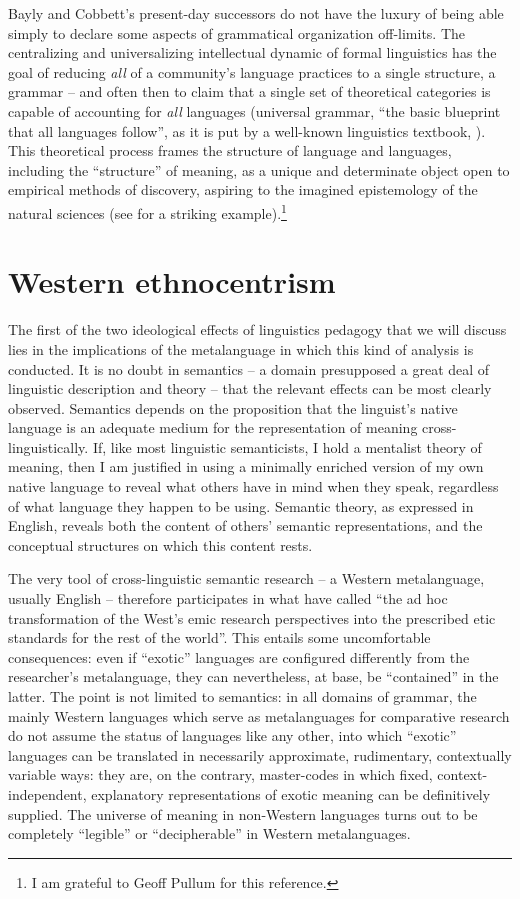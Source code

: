 \documentclass[output=paper]{langscibook}
\begin{document}
Bayly and Cobbett's present-day successors do not have the luxury of being able simply to declare some aspects of grammatical organization off-limits. The centralizing and universalizing intellectual dynamic of formal linguistics has the goal of reducing \emph{all} of a community's language practices to a single structure, a grammar – and often then to claim that a single set of theoretical categories is capable of accounting for \emph{all} languages (universal grammar, ``the basic blueprint that all languages follow'', as it is put by a well-known linguistics textbook, \citealt[18]{Fromkinetal2010}). This theoretical process frames the structure of language and languages, including the ``structure'' of meaning, as a unique and determinate object open to empirical methods of discovery, aspiring to the imagined epistemology of the natural sciences (see \citealt{Zwicky1973} for a striking example).\footnote{I am grateful to Geoff Pullum for this reference.}

\section{Western ethnocentrism}
\label{sec:riemer:westernethnocentrim}

The first of the two ideological effects of linguistics pedagogy that we will discuss lies in the implications of the metalanguage in which this kind of analysis is conducted. It is no doubt in semantics – a domain presupposed a great deal of linguistic description and theory – that the relevant effects can be most clearly observed. Semantics depends on the proposition that the linguist's native language is an adequate medium for the representation of meaning cross-linguistically. If, like most linguistic semanticists, I hold a mentalist theory of meaning, then I am justified in using a minimally enriched version of my own native language to reveal what others have in mind when they speak, regardless of what language they happen to be using. Semantic theory, as expressed in English, reveals both the content of others' semantic representations, and the conceptual structures on which this content rests.

The very tool of cross-linguistic semantic research – a Western metalanguage, usually English – therefore participates in what \citet[109]{AnchimbeJanney2017} have called ``the ad hoc transformation of the West's emic research perspectives into the prescribed etic standards for the rest of the world''. This entails some uncomfortable consequences: even if ``exotic'' languages are configured differently from the researcher's metalanguage, they can nevertheless, at base, be ``contained'' in the latter. The point is not limited to semantics: in all domains of grammar, the mainly Western languages which serve as metalanguages for comparative research do not assume the status of languages like any other, into which ``exotic'' languages can be translated in necessarily approximate, rudimentary, contextually variable ways: they are, on the contrary, master-codes in which fixed, context-independent, explanatory representations of exotic meaning can be definitively supplied. The universe of meaning in non-Western languages turns out to be completely ``legible'' or ``decipherable'' in Western metalanguages.
\end{document}
